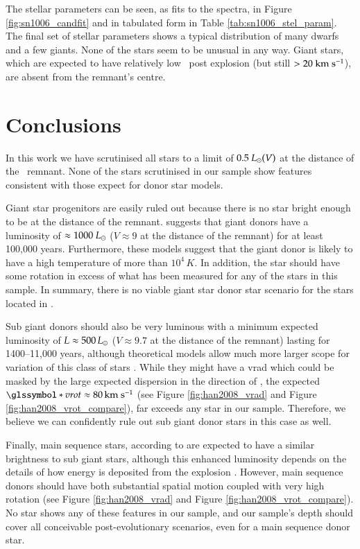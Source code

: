 The stellar parameters can be seen, as fits to the spectra, in Figure \ref{fig:sn1006_candfit} and in tabulated form in Table \ref{tab:sn1006_stel_param}. The final set of stellar parameters shows a typical distribution of many dwarfs and a few giants. None of the stars seem to be unusual in any way. Giant stars, which are expected to have relatively low \vrot\ post explosion (but still $> 20~\textrm{km}~\textrm{s}^{-1}$), are absent from the remnant's centre. 



\section{Conclusions}
\label{sec:sn1006:conclusion}
In this work we have scrutinised all stars to a limit of $0.5~\hbox{$L_{\odot}$}(V)$ at the distance of the \ remnant. None of the stars scrutinised in our sample show features consistent with those expect for donor star models. 

Giant star progenitors are easily ruled out because there is no star bright enough to be at the distance of the remnant. \citet{2000ApJS..128..615M} suggests that giant donors have a luminosity of $\approx 1000~\hbox{$L_{\odot}$}$ ($V\approx9$ at the distance of the remnant) for at least 100,000 years. Furthermore, these models suggest that the giant donor is likely to have a high temperature of more than $10^4\,K$. In addition, the star should have some rotation in excess of what has been measured for any of the stars in this sample. In summary, there is no viable giant star donor star scenario for the stars located in . 

Sub giant donors should also be very luminous \citep{2000ApJS..128..615M} with a minimum expected luminosity of $L\approx500\,\hbox{$L_{\odot}$}$ ($V\approx9.7$ at the distance of the remnant) lasting for 1400--11,000 years, although theoretical models allow much more larger scope for variation of this class of stars \citep{2003astro.ph..3660P}. While they might have a \gls{vrad} which could be masked by the large expected dispersion in the direction of , the expected $\vrot\approx80\,\kms$ (see Figure \vref{fig:han2008_vrad} and Figure \ref{fig:han2008_vrot_compare}), far exceeds any star in our sample.  Therefore, we believe we can confidently rule out sub giant donor stars in this case as well. 

Finally, main sequence stars, according to \citet{2000ApJS..128..615M} are expected to have a similar brightness to sub giant stars, although this enhanced luminosity depends on the details of how energy is deposited from the explosion \citep[see][]{2003astro.ph..3660P}.  However, main sequence donors should have both substantial spatial motion coupled with very high rotation (see Figure \vref{fig:han2008_vrad} and Figure \ref{fig:han2008_vrot_compare}). No star shows any of these features in our sample, and our sample's depth should cover all conceivable post-evolutionary scenarios, even for a main sequence donor star.

